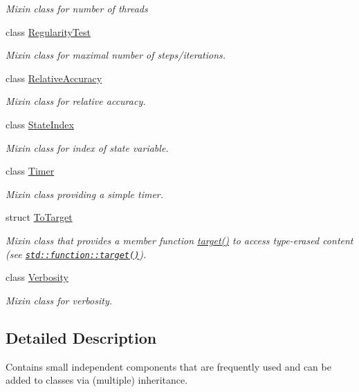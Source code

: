 \begin{DoxyCompactItemize}
\begin{DoxyCompactList}\small\item\em Mixin class for number of threads \end{DoxyCompactList}\item 
class \hyperlink{classSpacy_1_1Mixin_1_1RegularityTest}{Regularity\+Test}
\begin{DoxyCompactList}\small\item\em Mixin class for maximal number of steps/iterations. \end{DoxyCompactList}\item 
class \hyperlink{classSpacy_1_1Mixin_1_1RelativeAccuracy}{Relative\+Accuracy}
\begin{DoxyCompactList}\small\item\em Mixin class for relative accuracy. \end{DoxyCompactList}\item 
class \hyperlink{classSpacy_1_1Mixin_1_1StateIndex}{State\+Index}
\begin{DoxyCompactList}\small\item\em Mixin class for index of state variable. \end{DoxyCompactList}\item 
class \hyperlink{classSpacy_1_1Mixin_1_1Timer}{Timer}
\begin{DoxyCompactList}\small\item\em Mixin class providing a simple timer. \end{DoxyCompactList}\item 
struct \hyperlink{structSpacy_1_1Mixin_1_1ToTarget}{To\+Target}
\begin{DoxyCompactList}\small\item\em Mixin class that provides a member function \hyperlink{structSpacy_1_1Mixin_1_1ToTarget_a3510786172c63a074eda127276d13392}{target()} to access type-\/erased content (see \href{http://en.cppreference.com/w/cpp/utility/functional/function/target}{\tt std\+::function\+::target()}). \end{DoxyCompactList}\item 
class \hyperlink{classSpacy_1_1Mixin_1_1Verbosity}{Verbosity}
\begin{DoxyCompactList}\small\item\em Mixin class for verbosity. \end{DoxyCompactList}\end{DoxyCompactItemize}


\subsection{Detailed Description}
Contains small independent components that are frequently used and can be added to classes via (multiple) inheritance. 

